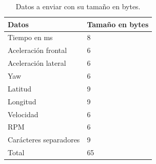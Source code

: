 \bgroup
\def\arraystretch{1}%
\begin{table}[htbp!]
\centering
\caption[Datos a enviar con su tamaño en bytes]{Datos a enviar con su tamaño en bytes.}
\begin{tabular}{ll}
\toprule
Datos & Tamaño en bytes \\ \midrule
Tiempo en ms & 8 \\
Aceleración frontal & 6 \\
Aceleración lateral & 6 \\
Yaw & 6 \\
Latitud & 9 \\
Longitud & 9 \\
Velocidad & 6 \\
RPM & 6 \\
Carácteres separadores & 9 \\ \midrule
Total & 65 \\ \bottomrule
\end{tabular}
\label{diag:datos_enviar}
\end{table}
\egroup